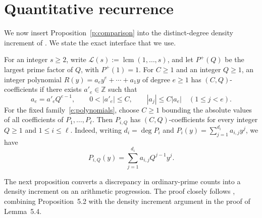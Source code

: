 \documentclass[12pt]{amsart}
\newcommand{\Z}{\mathbb Z}
\newcommand{\1}{\mathbf 1}
\newtheorem{remark}[theorem]{Remark}
\begin{document}

\section{Quantitative recurrence}

We now insert Proposition~\ref{p:comparison} into the distinct-degree
density increment of \cite{KMTT}.  We state the exact interface that we
use.

For an integer $s\geq2$, write
$\mathcal L(s):=\operatorname{lcm}(1,\ldots,s)$, and let $P^+(Q)$
be the largest prime factor of $Q$, with $P^+(1)=1$.
For $C\geq1$ and an integer $Q\geq1$, an integer polynomial
$R(y)=a_ey^e+\cdots+a_1y$ of degree $e\geq1$ has
$(C,Q)$-coefficients if there exists $a'_e\in\Z$ such that
\[
 a_e=a'_eQ^{e-1},\qquad 0<|a'_e|\leq C,\qquad
 |a_j|\leq C|a_e|\quad(1\leq j<e).
\]
For the fixed family~\eqref{e:polynomials}, choose $C\geq1$
bounding the absolute values of all coefficients of
$P_1,\ldots,P_\ell$. Then $P_{i,Q}$ has $(C,Q)$-coefficients
for every integer $Q\geq1$ and $1\leq i\leq\ell$.
Indeed, writing $d_i=\deg P_i$ and
$P_i(y)=\sum_{j=1}^{d_i}a_{i,j}y^j$, we have
\begin{equation}\label{e:rescaled-coefficients}
 P_{i,Q}(y)=\sum_{j=1}^{d_i}a_{i,j}Q^{j-1}y^j.
\end{equation}

The next proposition converts a discrepancy in ordinary-prime counts
into a density increment on an arithmetic progression. The proof closely follows \cite[Section~5]{KMTT}, combining
Proposition~5.2 with the density increment argument in the
proof of Lemma~5.4.
\end{document}
